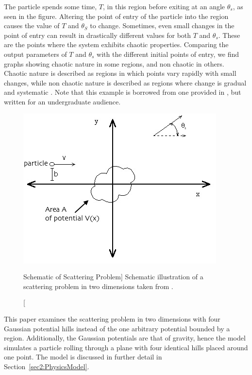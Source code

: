 \documentclass[12pt]{article} %
\begin{document}
The particle spends some time, $T$, in this region before exiting at an angle $\theta_s$, as seen in the figure. Altering the point of entry of the particle into the region causes the value of $T$ and $\theta_S$ to change. Sometimes, even small changes in the point of entry can result in drastically different values for both $T$ and $\theta_s$. These are the points where the system exhibits chaotic properties. Comparing the output parameters of $T$ and $\theta_s$ with the different initial points of entry, we find graphs showing chaotic nature in some regions, and non chaotic in others. Chaotic nature is described as regions in which points vary rapidly with small changes, while non chaotic nature is described as regions where change is gradual and systematic \cite{chaoticIntro}. Note that this example is borrowed from one provided in \cite{GRice}, but written for an undergraduate audience. 




\begin{figure}[H]
	\begin{center}
		\includegraphics[width=0.5\linewidth]{SchemOfScattering}
		\caption
		[Schematic of Scattering Problem]
		{Schematic illustration of a scattering problem in two dimensions taken from \cite{chaoticIntro}.}
		\label{fig:SchemOfScattering}
	\end{center}
\end{figure}

This paper examines the scattering problem in two dimensions with four Gaussian potential hills instead of the one arbitrary potential bounded by a region. Additionally, the Gaussian potentials are that of gravity, hence the model simulates a particle rolling through a plane with four identical hills placed around one point. The model is discussed in further detail in Section~\ref{sec2:PhysicsModel}.




\end{document}
